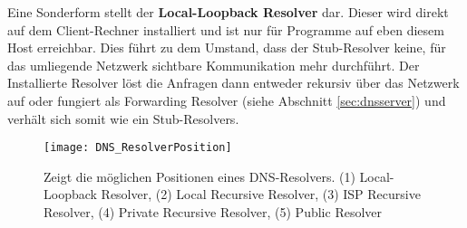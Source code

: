 Eine Sonderform stellt der \textbf{Local-Loopback Resolver} dar. Dieser wird direkt auf dem Client-Rechner installiert und ist nur für Programme auf eben diesem Host erreichbar. Dies führt zu dem Umstand, dass der Stub-Resolver keine, für das umliegende Netzwerk sichtbare Kommunikation mehr durchführt. Der Installierte Resolver löst die Anfragen dann entweder rekursiv über das Netzwerk auf oder fungiert als Forwarding Resolver (siehe Abschnitt \ref{sec:dnsserver}) und verhält sich somit wie ein Stub-Resolvers.

\begin{figure}[htbp]
    \centering
    \texttt{[image: DNS\_ResolverPosition]}
    \caption{Zeigt die möglichen Positionen eines DNS-Resolvers. (1) Local-Loopback Resolver, (2) Local Recursive Resolver, (3) ISP Recursive Resolver, (4) Private Recursive Resolver, (5) Public Resolver}
    \label{img:dnsresolverposition}
\end{figure}
